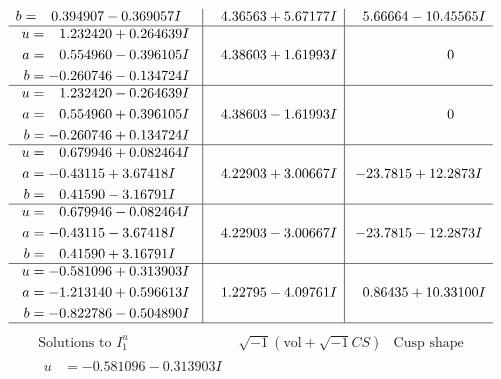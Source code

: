 \documentclass[1p]{elsarticle_modified}
\theoremstyle{definition}
\newcommand{\I}{\sqrt{-1}}
\begin{document}
$$\begin{array}{c|c|c}
\begin{aligned}
b &= \phantom{-}0.394907 - 0.369057 I\end{aligned}
 & \phantom{-}4.36563 + 5.67177 I & \phantom{-}5.66664 - 10.45565 I \\ \hline\begin{aligned}
u &= \phantom{-}1.232420 + 0.264639 I \\
a &= \phantom{-}0.554960 - 0.396105 I \\
b &= -0.260746 - 0.134724 I\end{aligned}
 & \phantom{-}4.38603 + 1.61993 I & \phantom{-0.000000 } 0 \\ \hline\begin{aligned}
u &= \phantom{-}1.232420 - 0.264639 I \\
a &= \phantom{-}0.554960 + 0.396105 I \\
b &= -0.260746 + 0.134724 I\end{aligned}
 & \phantom{-}4.38603 - 1.61993 I & \phantom{-0.000000 } 0 \\ \hline\begin{aligned}
u &= \phantom{-}0.679946 + 0.082464 I \\
a &= -0.43115 + 3.67418 I \\
b &= \phantom{-}0.41590 - 3.16791 I\end{aligned}
 & \phantom{-}4.22903 + 3.00667 I & -23.7815 + 12.2873 I \\ \hline\begin{aligned}
u &= \phantom{-}0.679946 - 0.082464 I \\
a &= -0.43115 - 3.67418 I \\
b &= \phantom{-}0.41590 + 3.16791 I\end{aligned}
 & \phantom{-}4.22903 - 3.00667 I & -23.7815 - 12.2873 I \\ \hline\begin{aligned}
u &= -0.581096 + 0.313903 I \\
a &= -1.213140 + 0.596613 I \\
b &= -0.822786 - 0.504890 I\end{aligned}
 & \phantom{-}1.22795 - 4.09761 I & \phantom{-}0.86435 + 10.33100 I\\
 \hline 
 \end{array}$$\newpage$$\begin{array}{c|c|c}  
\text{Solutions to }I^u_{1}& \I (\text{vol} + \sqrt{-1}CS) & \text{Cusp shape}\\
 \hline 
\begin{aligned}
u &= -0.581096 - 0.313903 I \\

\end{aligned}
\end{array}$$
\end{document}
